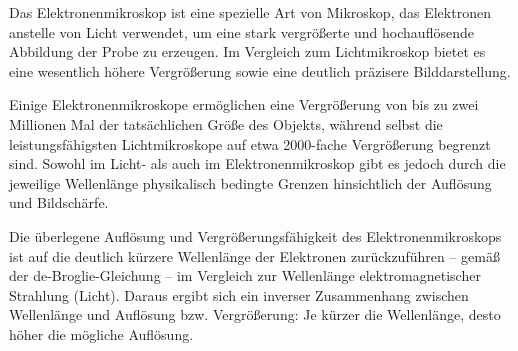 Das Elektronenmikroskop ist eine spezielle Art von Mikroskop, das Elektronen anstelle von Licht verwendet, um eine stark vergrößerte und hochauflösende Abbildung der Probe zu erzeugen. 
Im Vergleich zum Lichtmikroskop bietet es eine wesentlich höhere Vergrößerung sowie eine deutlich präzisere Bilddarstellung.

Einige Elektronenmikroskope ermöglichen eine Vergrößerung von bis zu zwei Millionen Mal der tatsächlichen Größe des Objekts, während selbst die leistungsfähigsten Lichtmikroskope auf etwa 2000-fache Vergrößerung begrenzt sind. Sowohl im Licht- als auch im Elektronenmikroskop gibt es jedoch durch die jeweilige Wellenlänge physikalisch bedingte Grenzen hinsichtlich der Auflösung und Bildschärfe.

Die überlegene Auflösung und Vergrößerungsfähigkeit des Elektronenmikroskops ist auf die deutlich kürzere Wellenlänge der Elektronen zurückzuführen – gemäß der de-Broglie-Gleichung – im Vergleich zur Wellenlänge elektromagnetischer Strahlung (Licht). Daraus ergibt sich ein inverser Zusammenhang zwischen Wellenlänge und Auflösung bzw. 
Vergrößerung: Je kürzer die Wellenlänge, desto höher die mögliche Auflösung.


